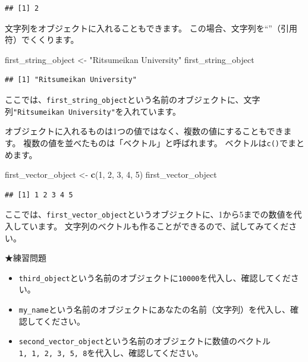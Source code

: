 \documentclass[]{book}
\newenvironment{Shaded}{\begin{snugshade}}{\end{snugshade}}
\newcommand{\KeywordTok}[1]{\textcolor[rgb]{0.13,0.29,0.53}{\textbf{#1}}}
\newcommand{\DecValTok}[1]{\textcolor[rgb]{0.00,0.00,0.81}{#1}}
\newcommand{\StringTok}[1]{\textcolor[rgb]{0.31,0.60,0.02}{#1}}
\newcommand{\NormalTok}[1]{#1}
\providecommand{\tightlist}{%
  \setlength{\itemsep}{0pt}\setlength{\parskip}{0pt}}
\begin{document}
\begin{verbatim}
## [1] 2
\end{verbatim}

文字列をオブジェクトに入れることもできます。
この場合、文字列を``''（引用符）でくくります。

\begin{Shaded}
\begin{Highlighting}[]
\NormalTok{first_string_object <-}\StringTok{ "Ritsumeikan University"}
\NormalTok{first_string_object}
\end{Highlighting}
\end{Shaded}

\begin{verbatim}
## [1] "Ritsumeikan University"
\end{verbatim}

ここでは、\texttt{first\_string\_object}という名前のオブジェクトに、文字列\texttt{"Ritsumeikan\ University"}を入れています。

オブジェクトに入れるものは1つの値ではなく、複数の値にすることもできます。
複数の値を並べたものは「ベクトル」と呼ばれます。
ベクトルは\texttt{c()}でまとめます。

\begin{Shaded}
\begin{Highlighting}[]
\NormalTok{first_vector_object <-}\StringTok{ }\KeywordTok{c}\NormalTok{(}\DecValTok{1}\NormalTok{, }\DecValTok{2}\NormalTok{, }\DecValTok{3}\NormalTok{, }\DecValTok{4}\NormalTok{, }\DecValTok{5}\NormalTok{)}
\NormalTok{first_vector_object}
\end{Highlighting}
\end{Shaded}

\begin{verbatim}
## [1] 1 2 3 4 5
\end{verbatim}

ここでは、\texttt{first\_vector\_object}というオブジェクトに、1から5までの数値を代入しています。
文字列のベクトルも作ることができるので、試してみてください。

★練習問題

\begin{itemize}
\tightlist
\item
  \texttt{third\_object}という名前のオブジェクトに\texttt{10000}を代入し、確認してください。
\item
  \texttt{my\_name}という名前のオブジェクトにあなたの名前（文字列）を代入し、確認してください。
\item
  \texttt{second\_vector\_object}という名前のオブジェクトに数値のベクトル\texttt{1,\ 1,\ 2,\ 3,\ 5,\ 8}を代入し、確認してください。
\end{itemize}
\end{document}
